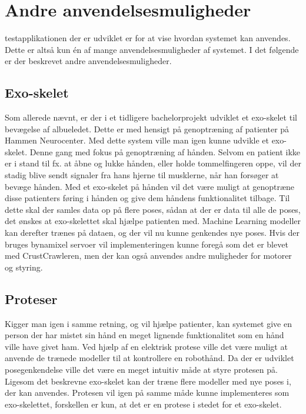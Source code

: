 \section{Andre anvendelsesmuligheder}
testapplikationen der er udviklet er for at vise hvordan systemet kan anvendes. Dette er altså kun én af mange anvendelsesmuligheder af systemet. I det følgende er der beskrevet andre anvendelsesmuligheder.

\subsection{Exo-skelet}
Som allerede nævnt, er der i et tidligere bachelorprojekt\citep{RefWorks:7} udviklet et exo-skelet til bevægelse af albueledet. Dette er med hensigt på genoptræning af patienter på Hammen Neurocenter. Med dette system ville man igen kunne udvikle et exo-skelet. Denne gang med fokus på genoptræning af hånden. Selvom en patient ikke er i stand til fx. at  åbne og lukke hånden, eller holde tommelfingeren oppe, vil der stadig blive sendt signaler fra hans hjerne til musklerne, når han forsøger at bevæge hånden. Med et exo-skelet på hånden vil det være muligt at genoptræne disse patienters føring i hånden og give dem håndens funktionalitet tilbage. Til dette skal der samles data op på flere poses, sådan at der er data til alle de poses, det ønskes at exo-skelettet skal hjælpe patienten med. Machine Learning modeller kan derefter trænes på dataen, og der vil nu kunne genkendes nye poses. Hvis der bruges bynamixel servoer vil implementeringen kunne foregå som det er blevet med CrustCrawleren, men der kan også anvendes andre muligheder for motorer og styring.

\subsection{Proteser}
Kigger man igen i samme retning, og vil hjælpe patienter, kan systemet give en person der har mistet sin hånd en meget lignende funktionalitet som en hånd ville have givet ham. Ved hjælp af en elektrisk protese ville det være muligt at anvende de trænede modeller til at kontrollere en robothånd. Da der er udviklet posegenkendelse ville det være en meget intuitiv måde at styre protesen på. Ligesom det beskrevne exo-skelet kan der træne flere modeller med nye poses i, der kan anvendes. Protesen vil igen på samme måde kunne implementeres som exo-skelettet, forskellen er kun, at det er en protese i stedet for et exo-skelet.


